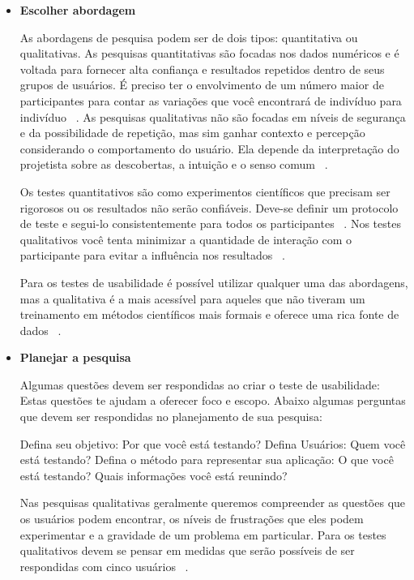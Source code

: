 \begin{itemize}

	\item \textbf{Escolher abordagem}

	As abordagens de pesquisa podem ser de dois tipos: quantitativa ou qualitativas. 
	As pesquisas quantitativas são focadas nos dados numéricos e é voltada para fornecer alta confiança e resultados repetidos dentro de seus grupos de usuários. É preciso ter o envolvimento de um número maior de participantes para contar as variações que você encontrará de indivíduo para indivíduo ~\cite{unger2009}.
	As pesquisas qualitativas não são focadas em níveis de segurança e da possibilidade de repetição, mas sim ganhar contexto e percepção considerando o comportamento do usuário. Ela depende da interpretação do projetista sobre as descobertas, a intuição e o senso comum ~\cite{unger2009}.

	Os testes quantitativos são como experimentos científicos que precisam ser rigorosos ou os resultados não serão confiáveis. Deve-se definir um protocolo de teste e segui-lo consistentemente para todos os participantes ~\cite{krug2010}.
	Nos testes qualitativos você tenta minimizar a quantidade de interação com o participante para evitar a influência nos resultados ~\cite{krug2010}.

	Para os testes de usabilidade é possível utilizar qualquer uma das abordagens, mas a qualitativa é a mais acessível para aqueles que não tiveram um treinamento em métodos científicos mais formais e oferece uma rica fonte de dados ~\cite{unger2009}.


	\item \textbf{Planejar a pesquisa}

	Algumas questões devem ser respondidas ao criar o teste de usabilidade: Estas questões te ajudam a oferecer foco e escopo. Abaixo algumas perguntas que devem ser respondidas no planejamento de sua pesquisa:

	
	\subitem Defina seu objetivo: Por que você está testando? %
	\subitem Defina Usuários: Quem você está testando? %
	\subitem Defina o método para representar sua aplicação: O que você está testando?
	\subitem Quais informações você está reunindo? 
	

Nas pesquisas qualitativas geralmente queremos compreender as questões que os usuários podem encontrar, os níveis de frustrações que eles podem experimentar e a gravidade de um problema em particular. Para os testes qualitativos devem se pensar em medidas que serão possíveis de ser respondidas com cinco usuários ~\cite{unger2009}. 


\end{itemize}
